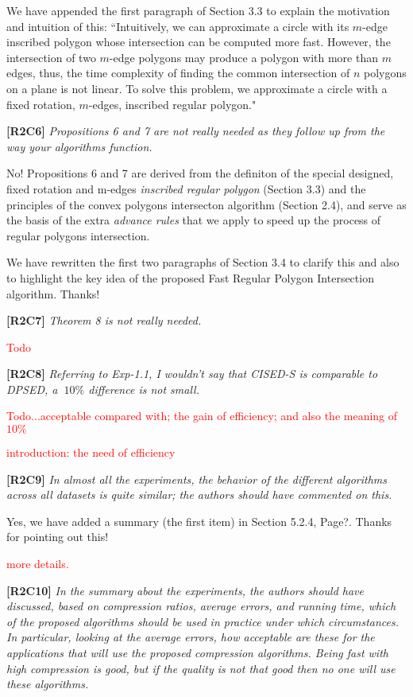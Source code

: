 \documentclass{letter}
\begin{document}
We have appended the first paragraph of Section 3.3 to explain the motivation and intuition of this: ``Intuitively, we can approximate a circle with its $m$-edge inscribed polygon {whose intersection can be computed more fast}. However, the intersection of two $m$-edge polygons may produce a polygon with more than $m$ edges, thus, the time complexity of finding the common intersection of $n$ polygons on a plane is not linear. To solve this problem, we approximate a circle with a fixed rotation, $m$-edges, inscribed regular polygon."



\textbf{[R2C6]} \emph{Propositions 6 and 7 are not really needed as they follow up from the way your algorithms function.}

No! Propositions 6 and 7 are derived from the definiton of the special designed, fixed rotation and m-edges \emph{inscribed regular polygon} (Section 3.3) and the principles of the convex polygons intersecton algorithm (Section 2.4), and serve as the basis of the extra \emph{advance rules} that we apply to speed up the process of regular polygons intersection.

We have rewritten the first two paragraphs of Section 3.4 to clarify this and also to highlight the key idea of the proposed Fast Regular Polygon Intersection algorithm. Thanks!

\textbf{[R2C7]} \emph{Theorem 8 is not really needed.}

\textcolor{red}{Todo}

\textbf{[R2C8]} \emph{Referring to Exp-1.1, I wouldn't say that CISED-S is comparable to DPSED, a $~10\%$ difference is not small.}

\textcolor{red}{Todo...acceptable compared with; the gain of efficiency; and also the meaning of $10\%$}

\textcolor{red}{introduction: the need of efficiency}

\textbf{[R2C9]} \emph{In almost all the experiments, the behavior of the different algorithms across all datasets is quite similar; the authors should have commented on this.}

Yes, we have added a summary (the first item) in Section 5.2.4, Page?. Thanks for pointing out this!

\textcolor{red}{more details.}

\textbf{[R2C10]} \emph{In the summary about the experiments, the authors should have discussed, based on compression ratios, average errors, and running time, which of the proposed algorithms should be used in practice under which circumstances. In particular, looking at the average errors, how acceptable are these for the applications that will use the proposed compression algorithms. Being fast with high compression is good, but if the quality is not that good then no one will use these algorithms.}
\end{document}
